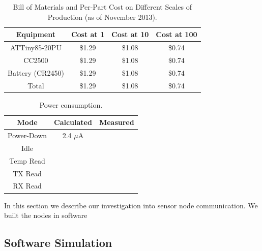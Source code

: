 %
%
\begin{table}%
  \begin{center}
  
  \begin{tabular}{| c | c | c | c |}

  \hline
  \textbf{Equipment} & \textbf{Cost at 1} & \textbf{Cost at 10} & \textbf{Cost at 100} \\
  \hline
  ATTiny85-20PU     & \$1.29 & \$1.08 & \$0.74 \\
  CC2500            & \$1.29 & \$1.08 & \$0.74 \\
  Battery (CR2450)  & \$1.29 & \$1.08 & \$0.74 \\
  Total             & \$1.29 & \$1.08 & \$0.74 \\
  \hline
  
  \end{tabular}  
  \end{center}
  \caption{Bill of Materials and Per-Part Cost on Different Scales of Production (as of November 2013).
  \label{table:bill}
  }
\end{table}

%
%
\begin{table}
  \begin{center}
  
  \begin{tabular}{| c | c | c |}

  \hline
  \textbf{Mode} & \textbf{Calculated} & \textbf{Measured} \\
  \hline
  Power-Down        & 2.4 $\mu$A & \\
  Idle              & & \\
  Temp Read         & & \\
  TX Read           & & \\
  RX Read           & & \\
  \hline
  
  \end{tabular}  
  \end{center}
  \caption{Power consumption.
  \label{table:power_consumption}
  }
\end{table}

In this section we describe our investigation into sensor node communication. We built the nodes in software 

\subsection{Software Simulation}


